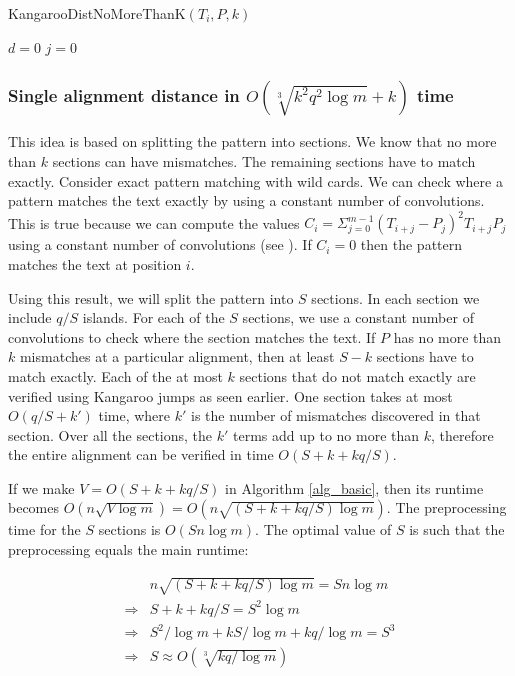 \begin{algorithm}
\caption{KangarooDistNoMoreThanK$(T_i, P, k)$}
\label{alg_verif1}
$d=0$\;
$j=0$\;
\end{algorithm}

\subsubsection{Single alignment distance in $O(\sqrt[3]{k^2q^2\log
m}+k)$ time}
\label{sec_alg2}
This idea is based on splitting the pattern into sections. We know that no more
than $k$ sections can have mismatches. The remaining sections have to match
exactly. Consider exact pattern matching with wild cards.
We can check where a pattern matches the text exactly by using a constant number of convolutions. This is
true because we can compute the values $C_i = \Sigma_{j=0}^{m-1}(T_{i+j}-P_j)^2T_{i+j}P_j$ using a constant
number of convolutions (see  \cite{CC07}). If $C_i=0$ then the pattern matches
the text at position $i$. 

Using this result, we will split the pattern into $S$
sections. In each section we include $q/S$ islands. For each of the $S$
sections, we use a constant number of convolutions to check where the section
matches the text. If $P$ has no more than $k$ mismatches at a particular
alignment, then at least $S-k$ sections have to match exactly. Each of the at
most $k$ sections that do not match exactly are verified using Kangaroo jumps as seen
earlier. One section takes at most $O(q/S+k')$ time, where $k'$ is the number
of mismatches discovered in that section. Over all the sections, the $k'$
terms add up to no more than $k$, therefore the entire alignment can be verified
in time $O(S+k+kq/S)$.


If we make $V=O(S + k + kq/S)$ in Algorithm \ref{alg_basic}, then its runtime
becomes $O(n \sqrt{V\log m}) = O(n \sqrt{(S + k + kq/S)\log m})$. 
The preprocessing time for the $S$ sections is $O(Sn \log m)$. The
optimal value of $S$ is such that the preprocessing equals the main runtime:

\begin{align*}
 & n \sqrt{(S + k + kq/S)\log m} = Sn \log m \\
\Rightarrow & S + k + kq/S = S^2 \log m\\
\Rightarrow & S^2/\log m + kS/\log m + kq/\log m = S^3\\
\Rightarrow & S \approx O(\sqrt[3]{kq/\log m})
\end{align*}

